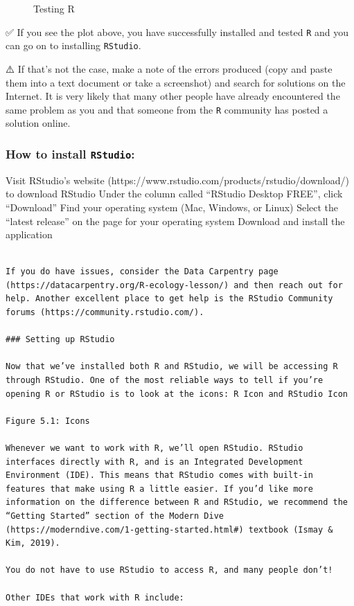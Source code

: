 \documentclass[
  letterpaper,
  DIV=11,
  numbers=noendperiod]{scrreprt}
\begin{document}
\begin{figure}
\begin{minipage}{0.50\linewidth}
{}


\end{minipage}%

\caption{\label{fig-Rtest}Testing R}

\end{figure}%

✅ If you see the plot above, you have successfully installed and tested
\texttt{R} and you can go on to installing \texttt{RStudio}.

⚠️ If that's not the case, make a note of the errors produced (copy and
paste them into a text document or take a screenshot) and search for
solutions on the Internet. It is very likely that many other people have
already encountered the same problem as you and that someone from the
\texttt{R} community has posted a solution online.

\subsubsection{\texorpdfstring{How to install
\texttt{RStudio}:}{How to install RStudio:}}\label{how-to-install-rstudio}

Visit RStudio's website
(https://www.rstudio.com/products/rstudio/download/) to download RStudio
Under the column called ``RStudio Desktop FREE'', click ``Download''
Find your operating system (Mac, Windows, or Linux) Select the ``latest
release'' on the page for your operating system Download and install the
application

\begin{verbatim}

If you do have issues, consider the Data Carpentry page (https://datacarpentry.org/R-ecology-lesson/) and then reach out for help. Another excellent place to get help is the RStudio Community forums (https://community.rstudio.com/).

### Setting up RStudio

Now that we’ve installed both R and RStudio, we will be accessing R through RStudio. One of the most reliable ways to tell if you’re opening R or RStudio is to look at the icons: R Icon and RStudio Icon

Figure 5.1: Icons

Whenever we want to work with R, we’ll open RStudio. RStudio interfaces directly with R, and is an Integrated Development Environment (IDE). This means that RStudio comes with built-in features that make using R a little easier. If you’d like more information on the difference between R and RStudio, we recommend the “Getting Started” section of the Modern Dive (https://moderndive.com/1-getting-started.html#) textbook (Ismay & Kim, 2019).

You do not have to use RStudio to access R, and many people don’t!

Other IDEs that work with R include:
\end{verbatim}
\end{document}
